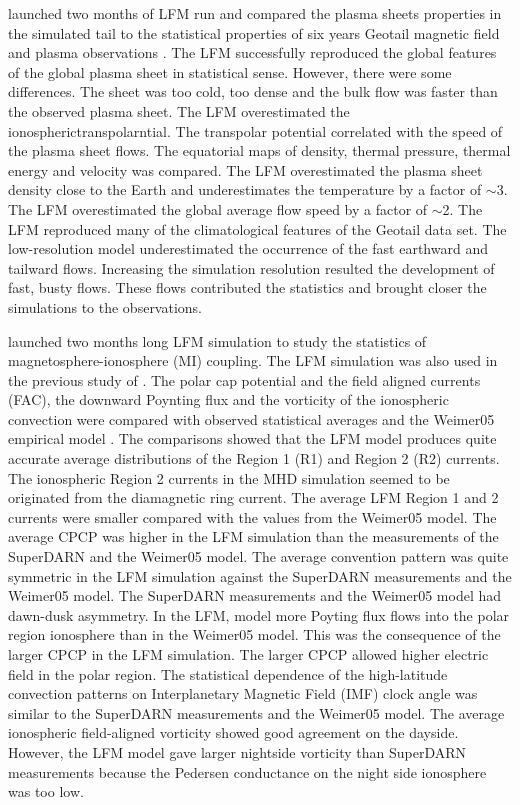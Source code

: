 \documentclass[linenumbers,draft]{agujournal}
\begin{document}
\citet{guild08:_geotail_lfm1,guild08:_geotail_lfm2} launched two months of LFM run and compared the plasma sheets properties in the simulated tail to the statistical properties of six years Geotail magnetic field and plasma observations \citep{kokubun94:_geotail_magnet_field_exper,mukai94:_low_energ_partic_lep_exper_geotail_satel}. The LFM successfully reproduced the global features of the global plasma sheet in statistical sense. However, there were some differences. The sheet was too cold, too dense and the bulk flow was faster than the observed plasma sheet. The LFM overestimated the ionospherictranspolarntial. The transpolar potential correlated with the speed of the plasma sheet flows. The equatorial maps of density, thermal pressure, thermal energy and velocity was compared. The LFM overestimated the plasma sheet density close to the Earth and underestimates the temperature by a factor of $\sim$3. The LFM overestimated the global average flow speed by a factor of $\sim$2. The LFM reproduced many of the climatological features of the Geotail data set. The low-resolution model underestimated the occurrence of the fast earthward and tailward flows. Increasing the simulation resolution resulted the development of fast, busty flows. These flows contributed the statistics and brought closer the simulations to the observations.

\citet{zhang11:_lyon_fedder_mobar_mhd} launched two months long LFM simulation to study the statistics of magnetosphere-ionosphere (MI) coupling. The LFM simulation was also used in the previous study of \citet{guild08:_geotail_lfm1}. The polar cap potential and the field aligned currents (FAC), the downward Poynting flux and the vorticity of the ionospheric convection were compared with observed statistical averages and the Weimer05 empirical model \citep{weimer05:_improv_joule}. The comparisons showed that the LFM model produces quite accurate average distributions of the Region 1 (R1) and Region 2 (R2) currents. The ionospheric Region 2 currents in the MHD simulation seemed to be originated from the diamagnetic ring current. The average LFM Region 1 and 2 currents were smaller compared with the values from the Weimer05 model. The average CPCP was higher in the LFM simulation than the measurements of the SuperDARN and the Weimer05 model. The average convention pattern was quite symmetric in the LFM simulation against the SuperDARN measurements and the Weimer05 model. The SuperDARN measurements and the Weimer05 model had dawn-dusk asymmetry. In the LFM, model more Poyting flux flows into the polar region ionosphere than in the Weimer05 model. This was the consequence of the larger CPCP in the LFM simulation. The larger CPCP allowed higher electric field in the polar region. The statistical dependence of the high-latitude convection patterns on Interplanetary Magnetic Field (IMF) clock angle was similar to the SuperDARN measurements \citep{sofko95:_direc_super} and the Weimer05 model. The average ionospheric field-aligned vorticity showed good agreement on the dayside. However, the LFM model gave larger nightside vorticity than SuperDARN measurements because the Pedersen conductance on the night side ionosphere was too low. 
\end{document}
